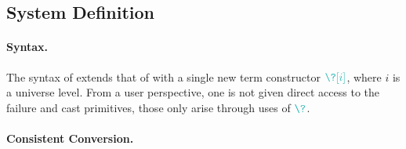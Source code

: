 \subsection{System Definition}

\paragraph{Syntax.}
\label{gcic-syntax}
The syntax of %
extends that of  with a single new term constructor $\scol{\?[i]}$,
where $i$ is a universe level. From a user perspective,
one is not given direct access to the failure and cast primitives,
those only arise through uses of $\scol{\?}$.

\paragraph{Consistent Conversion.}

